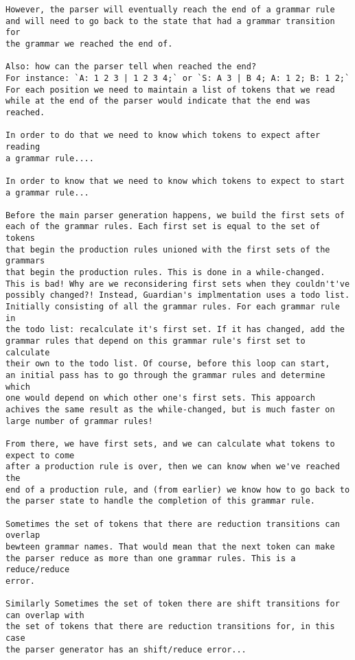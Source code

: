 {\begin{verbatim}
However, the parser will eventually reach the end of a grammar rule
and will need to go back to the state that had a grammar transition for
the grammar we reached the end of.

Also: how can the parser tell when reached the end?
For instance: `A: 1 2 3 | 1 2 3 4;` or `S: A 3 | B 4; A: 1 2; B: 1 2;`
For each position we need to maintain a list of tokens that we read
while at the end of the parser would indicate that the end was reached.

In order to do that we need to know which tokens to expect after reading
a grammar rule....

In order to know that we need to know which tokens to expect to start
a grammar rule...

Before the main parser generation happens, we build the first sets of
each of the grammar rules. Each first set is equal to the set of tokens
that begin the production rules unioned with the first sets of the grammars
that begin the production rules. This is done in a while-changed.
This is bad! Why are we reconsidering first sets when they couldn't've
possibly changed?! Instead, Guardian's implmentation uses a todo list.
Initially consisting of all the grammar rules. For each grammar rule in
the todo list: recalculate it's first set. If it has changed, add the
grammar rules that depend on this grammar rule's first set to calculate
their own to the todo list. Of course, before this loop can start,
an initial pass has to go through the grammar rules and determine which
one would depend on which other one's first sets. This appoarch
achives the same result as the while-changed, but is much faster on
large number of grammar rules!

From there, we have first sets, and we can calculate what tokens to expect to come
after a production rule is over, then we can know when we've reached the
end of a production rule, and (from earlier) we know how to go back to
the parser state to handle the completion of this grammar rule.

Sometimes the set of tokens that there are reduction transitions can overlap
bewteen grammar names. That would mean that the next token can make
the parser reduce as more than one grammar rules. This is a reduce/reduce
error.

Similarly Sometimes the set of token there are shift transitions for can overlap with
the set of tokens that there are reduction transitions for, in this case
the parser generator has an shift/reduce error...


\end{verbatim}}
